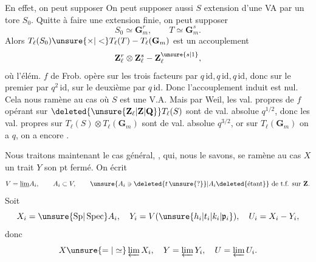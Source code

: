 En effet,  on peut supposer  
On peut supposer aussi $S$ extension d'une VA par un tore $S_0$. Quitte à faire une extension finie, on peut supposer
\[
S_0\simeq\mathbf G_m^r,\qquad T\simeq\mathbf G_m^s.
\]
Alors $T_\ell(S_0)\unsure{\times|<}T_\ell(T)\mathbin{-}T_\ell(\mathbf G_m)$ est un accouplement
\[
\mathbf Z_\ell^r\otimes\mathbf Z_\ell^s\mathbin{-}\mathbf Z_\ell^{\unsure{s|1}},
\]
où  l'élém. $f$ de Frob. opère sur  les trois facteurs par $q\,\mathrm{id},q\,\mathrm{id},q\,\mathrm{id}$, donc sur le premier  par $q^2\,\mathrm{id}$, sur le deuxième par $q\,\mathrm{id}$. Donc l'accouplement induit est nul. Cela nous ramène au cas où $S$ est une V.A. Mais par Weil, les val. propres de $f$ opérant sur $\deleted{\unsure{\mathbf Z_\ell|\mathbf Z|\mathbf Q}}T_\ell(S)$ sont de val. absolue $q^{1/2}$, donc les val. propres sur $T_\ell(S)\otimes T_\ell(\mathbf G_m)$ sont de val. absolue $q^{3/2}$, or sur $T_\ell(\mathbf G_m)$ on a $q$, on a encore .

Nous traitons maintenant le cas général, , qui, nous le savons, se ramène au cas $X$ un trait  $Y$ son pt fermé. On écrit
\[
V=\underline{\lim} A_i,\qquad A_i\subset V,\qquad \unsure{A_i\ni\deleted{t\,\unsure{?}}|A_i\deleted{\text{étant}}}\text{ de t.f. sur }\mathbf Z.
\]
 Soit
\[
X_i=\unsure{\mathrm{Sp}|\operatorname{Spec}} A_i,\quad Y_i=V(\unsure{h_i|t_i|k_i|\mathfrak p_i}),\quad U_i=X_i-Y_i,
\]
donc
\[
X\unsure{=|\simeq}\varprojlim X_i,\quad Y=\varprojlim Y_i,\quad U=\varprojlim U_i.
\]

